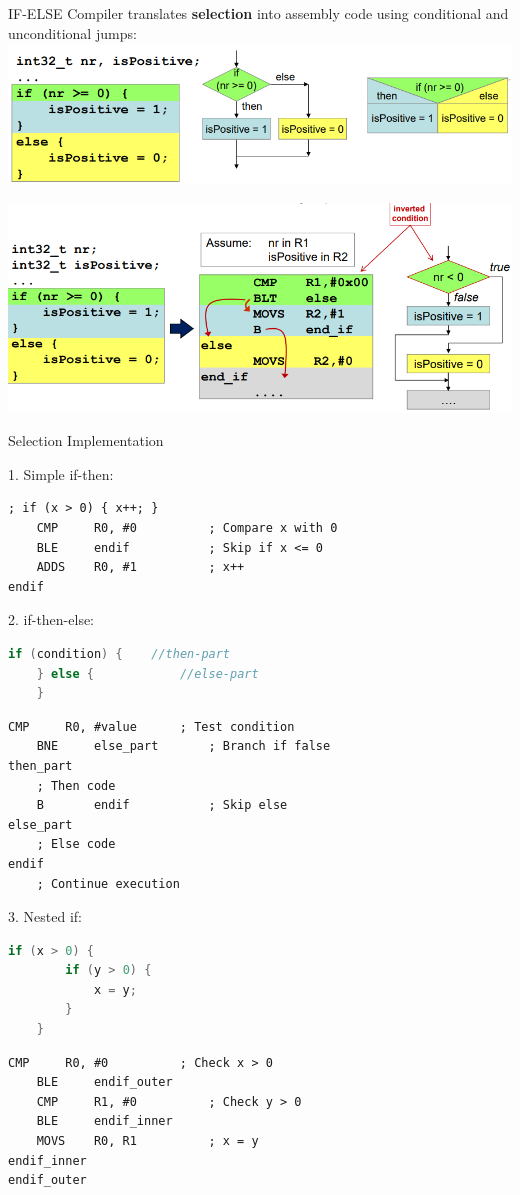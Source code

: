 \begin{definition}{IF-ELSE}
    Compiler translates \textbf{selection} into assembly code using conditional and unconditional jumps:\\
\includegraphics[width=\linewidth]{images/ifelse1.png}

\includegraphics[width=\linewidth]{images/ifelse2.png}
\end{definition}

\begin{KR}{Selection Implementation}

1. Simple if-then:
\begin{lstlisting}[language=armasm, style=basesmol]
    ; if (x > 0) { x++; }
    CMP     R0, #0          ; Compare x with 0
    BLE     endif           ; Skip if x <= 0
    ADDS    R0, #1          ; x++
endif
\end{lstlisting}

2. if-then-else:
\begin{lstlisting}[language=C, style=basesmol]
    if (condition) {    //then-part
    } else {            //else-part
    }
\end{lstlisting}
\vspace{-4mm}
\begin{lstlisting}[language=armasm, style=basesmol]
    CMP     R0, #value      ; Test condition
    BNE     else_part       ; Branch if false
then_part
    ; Then code
    B       endif           ; Skip else
else_part
    ; Else code
endif
    ; Continue execution
\end{lstlisting}

3. Nested if:
\begin{lstlisting}[language=C, style=basesmol]
    if (x > 0) {
        if (y > 0) {
            x = y;
        }
    }
\end{lstlisting}
\vspace{-4mm}
\begin{lstlisting}[language=armasm, style=basesmol]
    CMP     R0, #0          ; Check x > 0
    BLE     endif_outer
    CMP     R1, #0          ; Check y > 0
    BLE     endif_inner
    MOVS    R0, R1          ; x = y
endif_inner
endif_outer
\end{lstlisting}
\end{KR}

